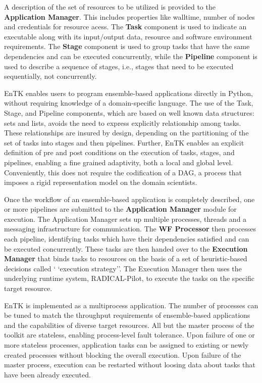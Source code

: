 A description of the set of resources to be utilized is provided to the 
\textbf{Application Manager}. This includes properties like walltime, number of
nodes and credentials for resource acess. The \textbf{Task} component is used to
indicate an executable along with its input/output data, resource and 
software environment requirements. The \textbf{Stage} component is used to group
tasks that have the same dependencies and can be executed concurrently, while
the \textbf{Pipeline} component is used to describe a sequence of stages,
i.e., stages that need to be executed sequentially, not concurrently.

EnTK enables users to program ensemble-based applications directly in Python,
without requiring knowledge of a domain-specific language. The use of the Task, 
Stage, and Pipeline components, which are based on well known data structures:
sets and lists, avoids the need to express explicitly relationship among
tasks. These relationships are insured by design, depending on the
partitioning of the set of tasks into stages and then pipelines. Further,
EnTK enables an explicit definition of pre and post conditions on the
execution of tasks, stages, and pipelines, enabling a fine grained
adaptivity, both a local and global level. Conveniently, this does not
require the codification of a DAG, a process that imposes a rigid
representation model on the domain scientists.

Once the workflow of an ensemble-based application is completely described,
one or more pipelines are submitted to the \textbf{Application Manager}
module for execution. The Application Manager sets up multiple processes, 
threads and a messaging infrastructure for communication. The
\textbf{WF Processor} then processes each pipeline, identifying tasks which have
their dependencies satisfied and can be executed concurrently. These tasks are 
then handed over to the \textbf{Execution Manager} that binds tasks to resources
on the basis of a set of heuristic-based decisions called `
`execution strategy''. The Execution Manager then uses the underlying runtime 
system, RADICAL-Pilot, to execute the tasks on the specific target resource.

EnTK is implemented as a multiprocess application. The number of processes
can be tuned to match the throughput requirements of ensemble-based
applications and the capabilities of diverse target resources. All but the
master process of the toolkit are stateless, enabling process-level fault
tolerance. Upon failure of one or more stateless processes, application tasks
can be assigned to existing or newly created processes without blocking the
overall execution. Upon failure of the master process, execution can be
restarted without loosing data about tasks that have been already executed.

